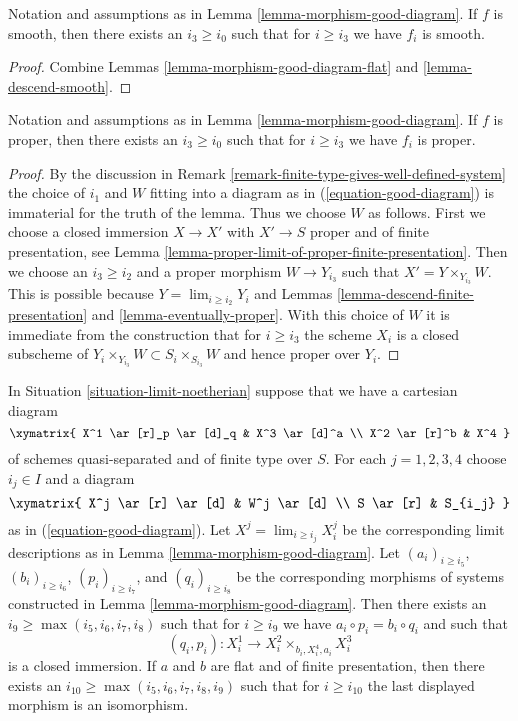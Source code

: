 \begin{lemma}
\label{lemma-morphism-good-diagram-smooth}
Notation and assumptions as in Lemma \ref{lemma-morphism-good-diagram}.
If $f$ is smooth, then there exists an $i_3 \geq i_0$ such that for
$i \geq i_3$ we have $f_i$ is smooth.
\end{lemma}

\begin{proof}
Combine Lemmas \ref{lemma-morphism-good-diagram-flat} and
\ref{lemma-descend-smooth}.
\end{proof}

\begin{lemma}
\label{lemma-morphism-good-diagram-proper}
Notation and assumptions as in Lemma \ref{lemma-morphism-good-diagram}.
If $f$ is proper, then there exists an $i_3 \geq i_0$ such that for
$i \geq i_3$ we have $f_i$ is proper.
\end{lemma}

\begin{proof}
By the discussion in 
Remark \ref{remark-finite-type-gives-well-defined-system}
the choice of $i_1$ and $W$ fitting into a diagram as in
(\ref{equation-good-diagram}) is immaterial for the truth of
the lemma. Thus we choose $W$ as follows.
First we choose a closed immersion $X \to X'$
with $X' \to S$ proper and of finite presentation, see
Lemma \ref{lemma-proper-limit-of-proper-finite-presentation}.
Then we choose an $i_3 \geq i_2$ and a proper morphism $W \to Y_{i_3}$
such that $X' = Y \times_{Y_{i_3}} W$. This is possible because
$Y = \lim_{i \geq i_2} Y_i$ and
Lemmas \ref{lemma-descend-finite-presentation} and
\ref{lemma-eventually-proper}.
With this choice of $W$ it is immediate from the construction that
for $i \geq i_3$ the scheme $X_i$ is a closed subscheme of
$Y_i \times_{Y_{i_3}} W \subset S_i \times_{S_{i_3}} W$
and hence proper over $Y_i$.
\end{proof}

\begin{lemma}
\label{lemma-good-diagram-fibre-product}
In Situation \ref{situation-limit-noetherian} suppose that we have a
cartesian diagram
$$
\xymatrix{
X^1 \ar[r]_p \ar[d]_q & X^3 \ar[d]^a \\
X^2 \ar[r]^b & X^4
}
$$
of schemes quasi-separated and of finite type over $S$.
For each $j = 1, 2, 3, 4$ choose $i_j \in I$ and a diagram
$$
\xymatrix{
X^j \ar[r] \ar[d] & W^j \ar[d] \\
S \ar[r] & S_{i_j}
}
$$
as in (\ref{equation-good-diagram}). Let
$X^j = \lim_{i \geq i_j} X^j_i$ be the corresponding limit descriptions
as in Lemma \ref{lemma-morphism-good-diagram}.
Let $(a_i)_{i \geq i_5}$, $(b_i)_{i \geq i_6}$, $(p_i)_{i \geq i_7}$, and
$(q_i)_{i \geq i_8}$ be the corresponding morphisms of systems constructed
in Lemma \ref{lemma-morphism-good-diagram}. Then there exists an
$i_9 \geq \max(i_5, i_6, i_7, i_8)$ such that for $i \geq i_9$ we have
$a_i \circ p_i = b_i \circ q_i$ and such that
$$
(q_i, p_i) : X^1_i \longrightarrow X^2_i \times_{b_i, X^4_i, a_i} X^3_i
$$
is a closed immersion.
If $a$ and $b$ are flat and of finite presentation, then there exists an
$i_{10} \geq \max(i_5, i_6, i_7, i_8, i_9)$ such that for $i \geq i_{10}$
the last displayed morphism is an isomorphism.
\end{lemma}


